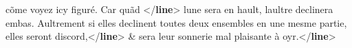 \begin{shaded}
\hspace*{1em}\hspace*{1em} cõme\mbox{}\newline 
\hspace*{1em}\hspace*{1em}\hspace*{1em}\hspace*{1em}\hspace*{1em}\hspace*{1em} voyez icy figuré. Car quãd {</\textbf{line}>}\mbox{}\newline 
\hspace*{1em}\hspace*{1em} lune sera en hault, laultre\mbox{}\newline 
\hspace*{1em}\hspace*{1em}\hspace*{1em}\hspace*{1em}\hspace*{1em}\hspace*{1em} declinera embas. Aultrement si elles declinent toutes deux ensembles en une\mbox{}\newline 
\hspace*{1em}\hspace*{1em}\hspace*{1em}\hspace*{1em}\hspace*{1em}\hspace*{1em} mesme partie, elles seront discord,{</\textbf{line}>}\mbox{}\newline 
\hspace*{1em}\hspace*{1em} \& sera leur sonnerie\mbox{}\newline 
\hspace*{1em}\hspace*{1em}\hspace*{1em}\hspace*{1em}\hspace*{1em}\hspace*{1em} mal plaisante à oyr.{</\textbf{line}>}\mbox{}\newline 
\hspace*{1em}\mbox{}\newline 

\end{shaded}
